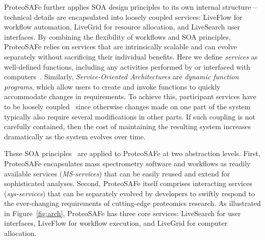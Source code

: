 \documentclass[arial,11pt]{article}
\newcommand{\SF}[1]{\textsf{#1}}
\newcommand{\SYSTEM}[0]{\SF{ProteoSAFe}\xspace}
\newcommand{\LiveSearch}[0]{\SF{LiveSearch}\xspace}
\newcommand{\LiveFlow}[0]{\SF{LiveFlow}\xspace}
\newcommand{\LiveGrid}[0]{\SF{LiveGrid}\xspace}
\begin{document}
\SYSTEM further applies SOA design principles to its own internal structure -- technical details are encapsulated into loosely coupled services: \LiveFlow for workflow automation, \LiveGrid for resource allocation, and \LiveSearch user interfaces. By combining the flexibility of workflows and SOA principles, \SYSTEM relies on services that are intrinsically scalable and can evolve separately without sacrificing their individual benefits.
%
Here we define {\em services} as well-defined functions, including any activities performed by or interfaced with computers~\cite{Broy:2007}. Similarly, {\em  Service-Oriented Architectures} are {\em  dynamic function programs}, which allow users to create and invoke functions to quickly accommodate changes in requirements. To achieve this, participant services have to be loosely coupled~\cite{Broy:2007} since otherwise changes made on one part of the system typically also require several modifications in other parts. If such coupling is not carefully contained, then the cost of maintaining the resulting system increases dramatically as the system evolves over time.

These SOA principles~\cite{Arrott:2007,Ermagan:2007} are applied to \SYSTEM at two abstraction levels. First, \SYSTEM encapsulates mass spectrometry software and workflows as readily available services ({\em  MS-services}) that can be easily reused and extend for sophisticated analyses. %
Second, \SYSTEM itself comprises interacting services ({\em  sys-services}) that can be separately evolved by developers to swiftly respond to the ever-changing requirements of cutting-edge proteomics research. As illustrated in Figure~\ref{fig:arch}, \SYSTEM has three core services: \LiveSearch for user interfaces, \LiveFlow for workflow execution, and \LiveGrid for computer allocation.
\end{document}

